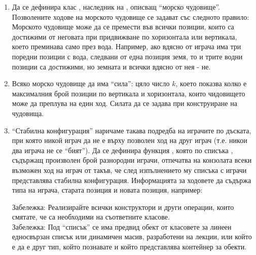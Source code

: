 \begin{enumerate}
\begin{enumerate}[label=\alph*)]
      \item Да се дефинира клас , наследник на , описващ ``морско чудовище''. Позволените ходове на морското чудовище се задават със следното правило: Морското чудовище може да се премести във всички позиции, които са достижими от неговата при придвижване по хоризонтала или вертикала, което преминава само през вода. Например, ако вдясно от играча има три поредни позиции с вода, следвани от една позиция земя, то и трите водни позиции са достижими, но земната и всички вдясно от нея - не.
      
      \item Всяко морско чудовище да има ``сила'': цяло число $k$, което показва колко е максималния брой позиции по вертикала и хоризонтала, които чидовището може да преплува на един ход. Силата да се задава при конструиране на чудовища. 

      \item ``Стабилна конфигурация'' наричаме такава подредба на играчите по дъската, при която никой играч да не е върху позволен ход на друг играч (т.е. никои два играча не се ``бият''). Да се дефинира функция , която по списъка , съдържащ произволен брой разнородни играчи, отпечатва на конзолата всеки възможен ход на играч от  такъв, че след изпълнението му списъка с играчи представлява стабилна конфигурация. Информацията за ходовете да съдържа типа на играча, старата позиция и новата позиция, например:



      \begin{flushleft}
      Забележка: Реализирайте всички конструктори и други операции, които смятате, че са необходими на съответните класове.\\

      Забележка: Под ``списък'' се има предвид обект от класовете за линеен едносвързан списък или динамичен масив, разработени на лекции, или който е да е друг тип, който познавате и който представлява контейнер за обекти.

      \end{flushleft}

    \end{enumerate}


\end{enumerate}

